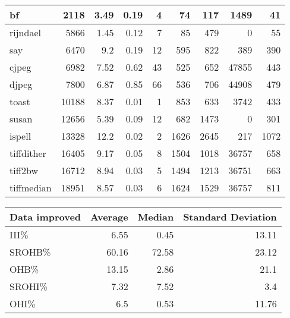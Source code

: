 \begin{tabular}{l|r|r|r|r|r|r|r|r}
\hline
 bf              &           2118 &     3.49 &   0.19 &    4 &     74 &          117 &  1489 &    41 \\
\hline
 rijndael        &           5866 &     1.45 &   0.12 &    7 &     85 &          479 &     0 &    55 \\
\hline
 say             &           6470 &     9.2  &   0.19 &   12 &    595 &          822 &   389 &   390 \\
\hline
 cjpeg           &           6982 &     7.52 &   0.62 &   43 &    525 &          652 & 47855 &   443 \\
\hline
 djpeg           &           7800 &     6.87 &   0.85 &   66 &    536 &          706 & 44908 &   479 \\
\hline
 toast           &          10188 &     8.37 &   0.01 &    1 &    853 &          633 &  3742 &   433 \\
\hline
 susan           &          12656 &     5.39 &   0.09 &   12 &    682 &         1473 &     0 &   301 \\
\hline
 ispell          &          13328 &    12.2  &   0.02 &    2 &   1626 &         2645 &   217 &  1072 \\
\hline
 tiffdither      &          16405 &     9.17 &   0.05 &    8 &   1504 &         1018 & 36757 &   658 \\
\hline
 tiff2bw         &          16712 &     8.94 &   0.03 &    5 &   1494 &         1213 & 36751 &   663 \\
\hline
 tiffmedian      &          18951 &     8.57 &   0.03 &    6 &   1624 &         1529 & 36757 &   811 \\
\hline
\end{tabular}\begin{tabular}{l|r|r|r}
\hline
 Data improved   &   Average &   Median &   Standard Deviation \\
\hline
 III\%            &      6.55 &     0.45 &                13.11 \\
\hline
 SROHB\%          &     60.16 &    72.58 &                23.12 \\
\hline
 OHB\%            &     13.15 &     2.86 &                21.1  \\
\hline
 SROHI\%          &      7.32 &     7.52 &                 3.4  \\
\hline
 OHI\%            &      6.5  &     0.53 &                11.76 \\
\hline
\end{tabular}
